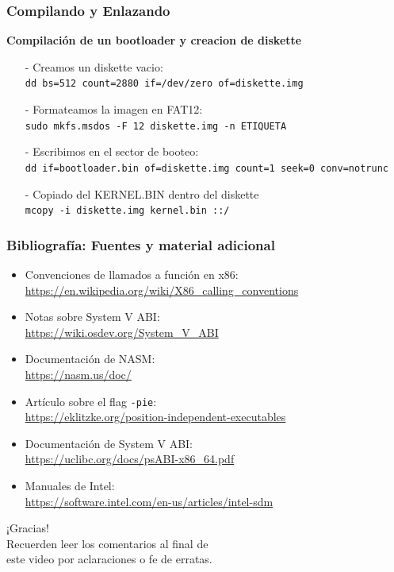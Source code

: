 \documentclass[aspectratio=169]{beamer}
\begin{document}
\begin{frame}
    \frametitle{Compilando y Enlazando}
    \textbf{Compilación de un bootloader y creacion de diskette}\\
    \vspace{0.2cm}
    \begin{itemize}
    \setlength\itemsep{1.7em}
    \item[-] \textcolor{verdeuca}{Creamos un diskette vacio:}\\
    \texttt{dd bs=512 count=2880 if=/dev/zero of=diskette.img}
    \item[-] \textcolor{verdeuca}{Formateamos la imagen en FAT12:}\\
    \texttt{sudo mkfs.msdos -F 12 diskette.img -n ETIQUETA}
    \item[-] \textcolor{verdeuca}{Escribimos en el sector de booteo:}\\
    \texttt{dd if=bootloader.bin of=diskette.img count=1 seek=0 conv=notrunc}
    \item[-] \textcolor{verdeuca}{Copiado del KERNEL.BIN dentro del diskette}\\
    \texttt{mcopy -i diskette.img kernel.bin ::/}
    \end{itemize}
\end{frame}

\begin{frame}[fragile]
    \frametitle{Bibliografía: Fuentes y material adicional}
    \begin{itemize}
    \item Convenciones de llamados a función en x86: \\
    \url{https://en.wikipedia.org/wiki/X86_calling_conventions}
    \item Notas sobre System V ABI: \\
    \url{https://wiki.osdev.org/System_V_ABI}
    \item Documentación de NASM: \\
    \url{https://nasm.us/doc/}
    \item Artículo sobre el flag \texttt{-pie}: \\
    \url{https://eklitzke.org/position-independent-executables}
    \item Documentación de System V ABI: \\
    \url{https://uclibc.org/docs/psABI-x86_64.pdf}
    \item Manuales de Intel: \\
    \url{https://software.intel.com/en-us/articles/intel-sdm}
    \end{itemize}
\end{frame}

\begin{frame}[plain]
\begin{center}
\vspace{2cm}
\huge ¡Gracias!\\
\vspace{2cm}
\normalsize Recuerden leer los comentarios al final de \\ este video por aclaraciones o fe de erratas.
\end{center}
\end{frame}
\end{document}
